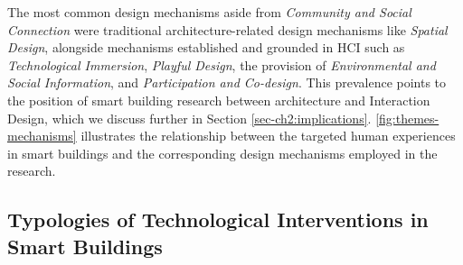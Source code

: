 \begin{widefigure}[!b]
    \centering
    
    \caption{An overview of the 11 targeted human experiences in smart buildings, along with their associated design mechanisms, and technological interventions. These human experiences, which are the primary focus of our scoping review, serve as the the starting point of this visualisation, linking to design mechanisms on one side and technological interventions on the other, enabled by human experiences. \autoref{sec:appendix-unfolded-sankey} presents an unfolded version of this visualisation, separating the connections into two distinct plots: one illustrating the relationships between human experiences and design mechanisms, and the other between human experiences and technological interventions.}
    \label{fig:themes-mechanisms}
\end{widefigure}

The most common design mechanisms aside from \emph{Community and Social Connection} were traditional architecture-related design mechanisms like \textit{Spatial Design}, alongside mechanisms established and grounded in HCI such as \textit{Technological Immersion}, \emph{Playful Design}, the provision of \emph{Environmental and Social Information}, and \textit{Participation and Co-design}.  This prevalence points to the position of smart building research between architecture and Interaction Design, which we discuss further in Section \ref{sec-ch2:implications}. 
\autoref{fig:themes-mechanisms} illustrates the relationship between the targeted human experiences in smart buildings and the corresponding design mechanisms employed in the research.



\subsection{Typologies of Technological Interventions in Smart Buildings}
\label{sec-ch2:findings-technology}

